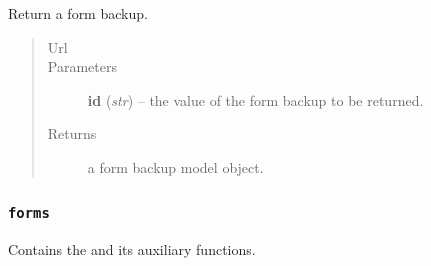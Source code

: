 \documentclass[letterpaper,10pt,english]{sphinxmanual}
\begin{document}
\begin{fulllineitems}
\begin{fulllineitems}
\end{fulllineitems}


\begin{fulllineitems}
\label{api:onlinelinguisticdatabase.controllers.formbackups.FormbackupsController.show}
Return a form backup.
\begin{quote}\begin{description}
\item[{Url }] \leavevmode
{}

\item[{Parameters}] \leavevmode
\textbf{id} (\emph{str}) -- the  value of the form backup to be returned.

\item[{Returns}] \leavevmode
a form backup model object.

\end{description}\end{quote}

\end{fulllineitems}


\end{fulllineitems}



\subsubsection{\texttt{forms}}
\label{api:forms}\label{api:module-onlinelinguisticdatabase.controllers.forms}
Contains the {\hyperref[api:onlinelinguisticdatabase.controllers.forms.FormsController]{}} and its auxiliary functions.
\label{api:module-forms}
\end{document}
